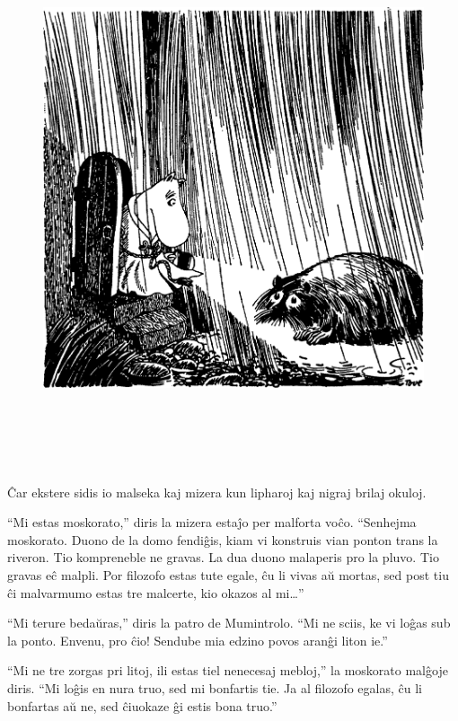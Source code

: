 \begin{figure}[htbp]
\centering
\includegraphics[width=450pt,height=450pt]{1-10.png}
\caption{}
\label{1-10}
\end{figure}

Ĉar ekstere sidis io malseka kaj mizera kun lipharoj kaj nigraj brilaj okuloj.

``Mi estas moskorato,'' diris la mizera estaĵo per malforta voĉo. ``Senhejma moskorato. Duono de la domo fendiĝis, kiam vi konstruis vian ponton trans la riveron. Tio kompreneble ne gravas. La dua duono malaperis pro la pluvo. Tio gravas eĉ malpli. Por filozofo estas tute egale, ĉu li vivas aŭ mortas, sed post tiu ĉi malvarmumo estas tre malcerte, kio okazos al mi{\ldots}''

``Mi terure bedaŭras,'' diris la patro de Mumintrolo. ``Mi ne sciis, ke vi loĝas sub la ponto. Envenu, pro ĉio! Sendube mia edzino povos aranĝi liton ie.''

``Mi ne tre zorgas pri litoj, ili estas tiel nenecesaj mebloj,'' la moskorato malĝoje diris. ``Mi loĝis en nura truo, sed mi bonfartis tie. Ja al filozofo egalas, ĉu li bonfartas aŭ ne, sed ĉiuokaze ĝi estis bona truo.''

